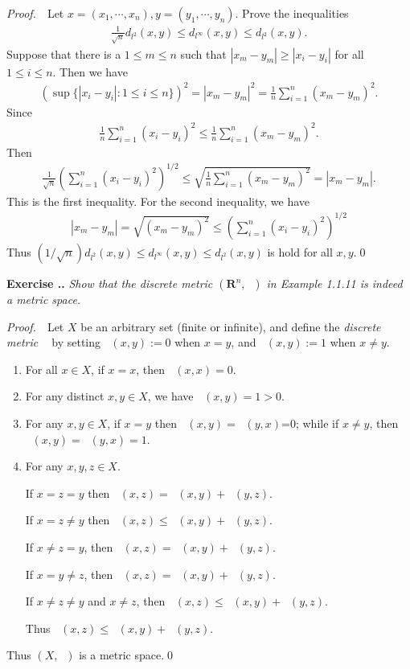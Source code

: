 \documentclass{book}
\DeclareMathOperator{\disc}{\mathit{d}_{\mathrm{disc}}}
\newcommand{\pff}{\vspace{.25em}\noindent\emph{Proof.}~~}
\newcounter{Exercise}[section]
\renewcommand{\theExercise}{\thesection.\arabic{Exercise}.}
\newcommand{\new}{\vspace{1.5em}\noindent\textbf{Exercise \stepcounter{Exercise}\textbf{\theExercise}} }
\begin{document}
\pff Let $x=(x_1,\cdots,x_n),y=(y_1,\cdots,y_n)$. Prove the inequalities
    \begin{align*}
        \frac{1}{\sqrt{n}}d_{l^2}(x,y)\leq d_{l^\infty}(x,y)\leq d_{l^2}(x,y).
    \end{align*}
Suppose that there is a $1\leq m\leq n$ such that $|x_m-y_m|\geq|x_i-y_i|$ for all $1\leq i\leq n$. Then we have
    \begin{align*}
        (\sup\{|x_i-y_i|:1\leq i\leq n\})^2=|x_m-y_m|^2=\frac{1}{n}\sum_{i=1}^{n}(x_m-y_m)^2.
    \end{align*}
Since
    \begin{align*}
        \frac{1}{n}\sum_{i=1}^{n}(x_i-y_i)^2
        \leq\frac{1}{n}\sum_{i=1}^{n}(x_m-y_m)^2.
    \end{align*}
Then
    \begin{align*}
        \frac{1}{\sqrt{n}}\left(\sum_{i=1}^{n}(x_i-y_i)^2\right)^{1/2}\leq\sqrt{\frac{1}{n}\sum_{i=1}^{n}(x_m-y_m)^2}=|x_m-y_m|.
    \end{align*}
This is the first inequality. For the second inequality, we have
    \begin{align*}
        |x_m-y_m|=\sqrt{(x_m-y_m)^2}\leq\left(\sum_{i=1}^{n}(x_i-y_i)^2\right)^{1/2}
    \end{align*}
Thus $(1/\sqrt{n})d_{l^2}(x,y)\leq d_{l^\infty}(x,y)\leq d_{l^2}(x,y)$ is hold for all $x,y$.\qed

\new\emph{Show that the discrete metric $(\mathbf{R}^n,\disc)$ in Example 1.1.11 is indeed a metric space.}

\pff Let $X$ be an arbitrary set (finite or infinite), and define the \emph{discrete metric} $\disc$ by setting $\disc(x,y):=0$ when $x=y$, and $\disc(x,y):=1$ when $x\neq y$.
    \begin{enumerate}
        \item For all $x\in X$, if $x=x$, then $\disc(x,x)=0$.
        \item For any distinct $x,y\in X$, we have $\disc(x,y)=1>0$.
        \item For any $x,y\in X$, if $x=y$ then $\disc(x,y)=\disc(y,x)$=0; while if $x\neq y$, then $\disc(x,y)=\disc(y,x)=1$.
        \item For any $x,y,z\in X$.
        
        If $x=z=y$ then $\disc(x,z)=\disc(x,y)+\disc(y,z)$.
        
        If $x=z\neq y$ then $\disc(x,z)\leq \disc(x,y)+\disc(y,z)$.
        
        If $x\neq z=y$, then $\disc(x,z)=\disc(x,y)+\disc(y,z)$.

        If $x=y\neq z$, then $\disc(x,z)=\disc(x,y)+\disc(y,z)$.
        
        If $x\neq z\neq y$ and $x\neq z$, then $\disc(x,z)\leq \disc(x,y)+\disc(y,z)$.

        Thus $\disc(x,z)\leq \disc(x,y)+\disc(y,z)$.
    \end{enumerate}
Thus $(X,\disc)$ is a metric space.\qed
\end{document}
